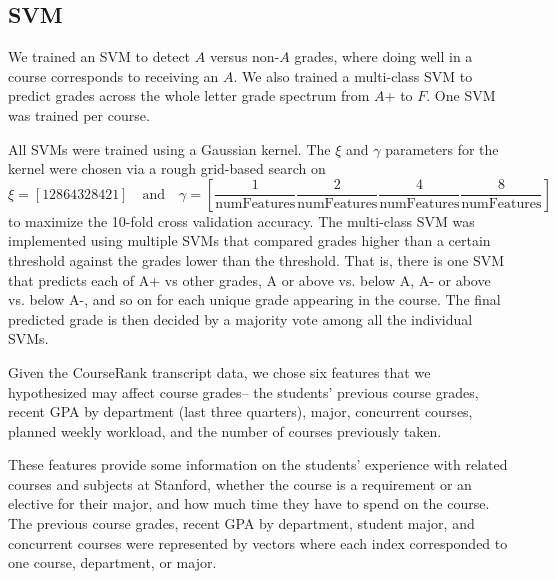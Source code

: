 \subsection{SVM}
We trained an SVM to detect $A$ versus non-$A$ grades, where doing well in a course corresponds to receiving an $A$.  We also trained a multi-class SVM to predict grades across the whole letter grade spectrum from $A$+ to $F$. One SVM was trained per course.

All SVMs were  trained using a Gaussian kernel. The $\xi$ and $\gamma$ parameters for the kernel were chosen via a rough grid-based search on 
\begin{equation*}
\xi=[128 64 32 8 4 2 1] \quad \textrm{and} \quad
\gamma=\left[\frac{1}{\textrm{numFeatures}} \frac{2}{\textrm{numFeatures}} \frac{4}{\textrm{numFeatures}} \frac{8}{\textrm{numFeatures}}\right]
\end{equation*}
to maximize the 10-fold cross validation accuracy. The multi-class SVM was implemented using multiple SVMs that compared grades higher than a certain threshold against the grades lower than the threshold. That is, there is one SVM that predicts each of  A+ vs other grades, A or above vs. below A, A- or above vs. below A-, and so on for each unique grade appearing in the course. The final predicted grade is then decided by a majority vote among all the individual SVMs.

Given the CourseRank transcript data, we chose six features that we hypothesized may affect course grades-- the students' previous course grades, recent GPA by department (last three quarters), major, concurrent courses, planned weekly workload, and the number of courses previously taken.

These features provide some information on the students' experience with related courses and subjects at Stanford, whether the course is a requirement or an elective for their major, and how much time they have to spend on the course. The previous course grades, recent GPA by department, student major, and concurrent courses were represented by vectors where each index corresponded to one course, department, or major.




